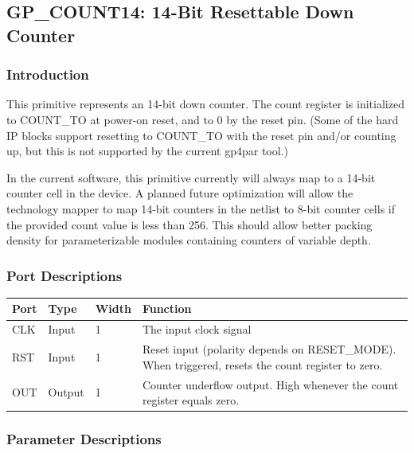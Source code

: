 \documentclass[11pt]{article}
\begin{document}

\pagebreak
\subsection{GP\_COUNT14: 14-Bit Resettable Down Counter}

\subsubsection{Introduction}
This primitive represents an 14-bit down counter. The count register is initialized to COUNT\_TO at power-on reset, and 
to 0 by the reset pin. (Some of the hard IP blocks support resetting to COUNT\_TO with the reset pin and/or counting 
up, but this is not supported by the current gp4par tool.)

In the current software, this primitive currently will always map to a 14-bit counter cell in the device. A planned 
future optimization will allow the technology mapper to map 14-bit counters in the netlist to 8-bit counter cells if 
the provided count value is less than 256. This should allow better packing density for parameterizable modules 
containing counters of variable depth.

\subsubsection{Port Descriptions}

\begin{tabularx}{5in}{|l|l|l|X|}
\hline
{\bfseries Port} & {\bfseries Type} & {\bfseries Width} & {\bfseries Function} \\
\hline
CLK & Input & 1 & The input clock signal\\
\hline
RST & Input & 1 & Reset input (polarity depends on RESET\_MODE). When triggered, resets the count register to zero. \\
\hline
OUT & Output & 1 & Counter underflow output. High whenever the count register equals zero. \\
\hline
\end{tabularx}

\subsubsection{Parameter Descriptions}
\end{document}
